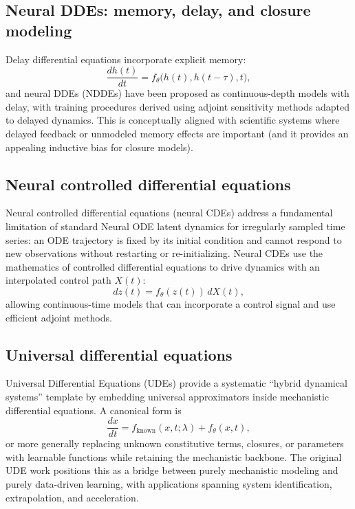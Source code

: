 \documentclass[11pt]{article}
\begin{document}
\subsection{Neural DDEs: memory, delay, and closure modeling}

Delay differential equations incorporate explicit memory:
\begin{equation}
\frac{dh(t)}{dt} = f_\theta\big(h(t), h(t-\tau), t\big),
\end{equation}
and neural DDEs (NDDEs) have been proposed as continuous-depth models with delay, with training procedures derived using adjoint sensitivity methods adapted to delayed dynamics. This is conceptually aligned with scientific systems where delayed feedback or unmodeled memory effects are important (and it provides an appealing inductive bias for closure models).

\subsection{Neural controlled differential equations}

Neural controlled differential equations (neural CDEs) address a fundamental limitation of standard Neural ODE latent dynamics for irregularly sampled time series: an ODE trajectory is fixed by its initial condition and cannot respond to new observations without restarting or re-initializing. Neural CDEs use the mathematics of controlled differential equations to drive dynamics with an interpolated control path $X(t)$:
\begin{equation}
dz(t)= f_\theta(z(t))\,dX(t),
\end{equation}
allowing continuous-time models that can incorporate a control signal and use efficient adjoint methods.

\subsection{Universal differential equations}

Universal Differential Equations (UDEs) provide a systematic ``hybrid dynamical systems'' template by embedding universal approximators inside mechanistic differential equations. A canonical form is
\begin{equation}
\frac{dx}{dt} = f_{\text{known}}(x,t;\lambda) + f_\theta(x,t),
\end{equation}
or more generally replacing unknown constitutive terms, closures, or parameters with learnable functions while retaining the mechanistic backbone. The original UDE work positions this as a bridge between purely mechanistic modeling and purely data-driven learning, with applications spanning system identification, extrapolation, and acceleration.
\end{document}
